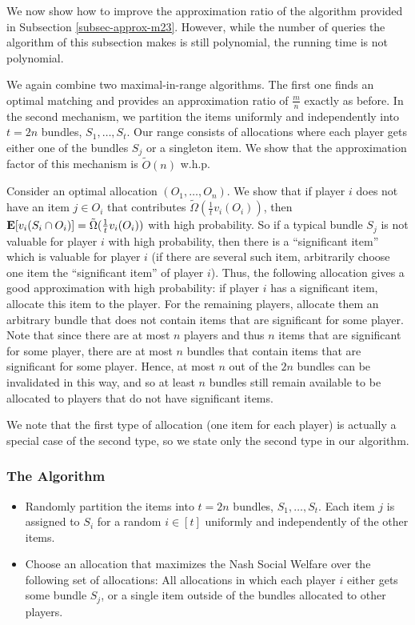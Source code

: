 \documentclass{theoretics}
\newcommand{\E}{\mbox{\bf E}}
\begin{document}
We now show how to improve the approximation ratio of the algorithm provided in Subsection \ref{subsec-approx-m23}. However, while the number of queries the algorithm of this subsection makes is still polynomial, the running time is not polynomial. 

We again combine two maximal-in-range algorithms. The first one finds an optimal matching and provides an approximation ratio of $\frac m n$ exactly as before. In the second mechanism, we partition the items uniformly and independently into $t=2n$ bundles, $S_1,\ldots, S_t$. Our range consists of allocations where each player gets either one of the bundles $S_j$ or a singleton item. We show that the approximation factor of this mechanism is $\tilde{O}(n)$ w.h.p.

Consider an optimal allocation $(O_1,\ldots,O_n)$. We show that if player $i$ does not have an item $j\in O_i$ that contributes  $\tilde{\Omega}(\frac{1}{t} v_i(O_i))$, then $\E[v_i(S_i \cap O_i)] = \tilde{\Omega}(\frac{1}{t} v_i(O_i))$ with high probability. So if a typical bundle $S_j$ is not valuable for player $i$ with high probability, then there is a ``significant item'' which is valuable for player $i$ (if there are several such item, arbitrarily choose one item the ``significant item'' of player $i$). Thus, the following allocation gives a good approximation with high probability: if player $i$ has a significant item, allocate this item to the player. For the remaining players, allocate them an arbitrary bundle that does not contain items that are significant for some player. Note that since there are at most $n$ players and thus $n$ items that are significant for some player, there are at most $n$ bundles that contain items that are significant for some player. Hence, at most $n$ out of the $2n$ bundles can be invalidated in this way, and so at least $n$ bundles still remain available to be allocated to players that do not have significant items.

We note that the first type of allocation (one item for each player) is actually a special case of the second type, so we state only the second type in our algorithm.

\subsubsection*{The Algorithm}

\begin{itemize}
\item Randomly partition the items into $t=2n$ bundles, $S_1,\ldots, S_{t}$. Each item $j$ is assigned to $S_i$ for a random $i \in [t]$ uniformly and independently of the other items.
\item Choose an allocation that maximizes the Nash Social Welfare over the following set of allocations:
All allocations in which each player $i$ either gets some bundle $S_j$, or a single item outside of the bundles allocated to other players.
\end{itemize}
\end{document}
